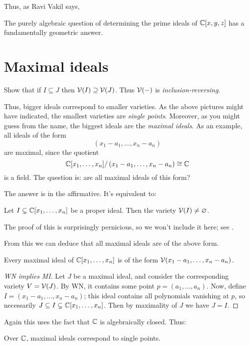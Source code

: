 Thus, as Ravi Vakil \cite{ref:vakil} says,
\begin{moral}
	The purely algebraic question of determining the prime ideals of $\mathbb C[x,y,z]$
	has a fundamentally geometric answer.
\end{moral}

\section{Maximal ideals}
\begin{ques}
	Show that if $I \subseteq J$ then $\mathcal V(I) \supseteq \mathcal V(J)$.
	Thus $\mathcal V(-)$ is \emph{inclusion-reversing}.
\end{ques}
Thus, bigger ideals correspond to smaller varieties.
As the above pictures might have indicated,
the smallest varieties are \emph{single points}.
Moreover, as you might guess from the name,
the biggest ideals are the \emph{maximal ideals}.
As an example, all ideals of the form
\[ \left( x_1-a_1, \dots, x_n-a_n \right) \]
are maximal, since the quotient
\[ \mathbb C[x_1, \dots, x_n] / \left( x_1-a_1, \dots, x_n-a_n \right) \cong \mathbb C \]
is a field.
The question is: are all maximal ideals of this form?

The answer is in the affirmative.  It's equivalent to:
\begin{theorem}
	Let $I \subsetneq \mathbb C[x_1, \dots, x_n]$ be a proper ideal.
	Then the variety $\mathcal V(I) \neq \varnothing$.
\end{theorem}
The proof of this is surprisingly pernicious,
so we won't include it here;
see \cite[\S7.4.3]{ref:vakil}.

From this we can deduce that all maximal ideals are of the above form.
\begin{theorem}
	Every maximal ideal of $\mathbb C[x_1, \dots, x_n]$
	is of the form $\mathcal V(x_1-a_1, \dots, x_n-a_n)$.
\end{theorem}
\begin{proof}
	[WN implies MI]
	Let $J$ be a maximal ideal, and consider the corresponding variety $V = \mathcal V(J)$.
	By WN, it contains some point $p=(a_1, \dots, a_n)$.
	Now, define $I = (x_1-a_1, \dots, x_n-a_n)$; this ideal contains all polynomials
	vanishing at $p$, so necessarily $J \subseteq I \subsetneq \mathbb C[x_1, \dots, x_n]$.
	Then by maximality of $J$ we have $J=I$.
\end{proof}
Again this uses the fact that $\mathbb C$ is algebraically closed. Thus:
\begin{moral}
	Over $\mathbb C$, maximal ideals correspond to single points.
\end{moral}

